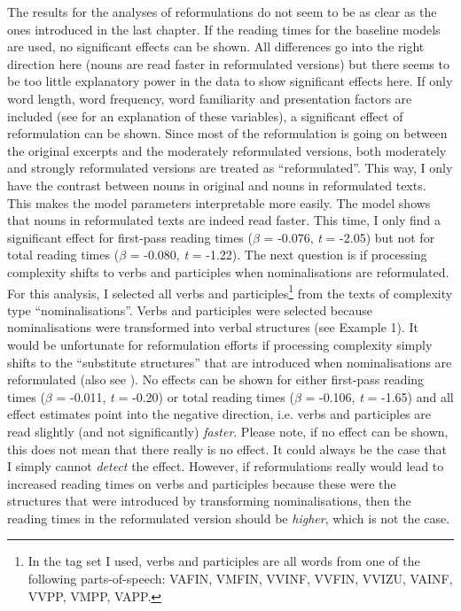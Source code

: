 \documentclass[output=paper]{langsci/langscibook}
\begin{document}
The results for the analyses of reformulations do not seem to be as clear as the ones introduced in the last chapter. If the reading times for the baseline models are used, no significant effects can be shown. All differences go into the right direction here (nouns are read faster in reformulated versions) but there seems to be too little explanatory power in the data to show significant effects here. If only word length, word frequency, word familiarity and presentation factors are included (see  for an explanation of these variables), a significant effect of reformulation can be shown. Since most of the reformulation is going on between the original excerpts and the moderately reformulated versions, both moderately and strongly reformulated versions are treated as ``reformulated''. This way, I only have the contrast between nouns in original and nouns in reformulated texts. This makes the model parameters interpretable more easily. The model shows that nouns in reformulated texts are indeed read faster. This time, I only find a significant effect for first-pass reading times (\textit{$\beta $} = -0.076, \textit{t} = -2.05) but not for total reading times (\textit{$\beta $} = -0.080, \textit{t} = -1.22).
The next question is if processing complexity shifts to verbs and participles when nominalisations are reformulated. For this analysis, I selected all verbs and participles\footnote{In the tag set I used, verbs and participles are all words from one of the following parts-of-speech: VAFIN, VMFIN, VVINF, VVFIN, VVIZU, VAINF, VVPP, VMPP, VAPP.}{ }from the texts of complexity type ``nominalisations''. Verbs and participles were selected because nominalisations were transformed into verbal structures (see Example 1). It would be unfortunate for reformulation efforts if processing complexity simply shifts to the ``substitute structures'' that are introduced when nominalisations are reformulated (also see ). No effects can be shown for either first-pass reading times (\textit{$\beta $} = -0.011, \textit{t} = -0.20) or total reading times (\textit{$\beta $} = -0.106, \textit{t} = -1.65) and all effect estimates point into the negative direction, i.e. verbs and participles are read slightly (and not significantly) \textit{faster}. Please note, if no effect can be shown, this does not mean that there really is no effect. It could always be the case that I simply cannot \textit{detect} the effect. However, if reformulations really would lead to increased reading times on verbs and participles because these were the structures that were introduced by transforming nominalisations, then the reading times in the reformulated version should be \textit{higher}, which is not the case. 
\end{document}
